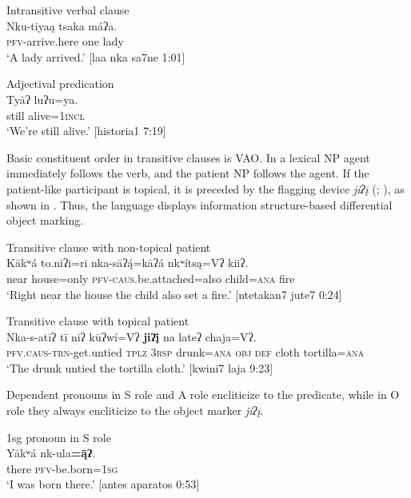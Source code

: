 \documentclass[output=paper]{../langscibook}
\begin{document}
\ea
\label{ex:campbell:2}
{Intransitive verbal clause}\\
\gll Nku-tiyaą  tsaka  máʔa.\\
     \textsc{pfv}{}-arrive.here  one  lady\\
\glt ‘A lady arrived.’ [laa nka sa7ne 1:01]
\z

\ea\label{ex:campbell:3}
{Adjectival predication}\\
\gll Tyāʔ  luʔu=ya.\\
     still  alive=\textsc{1incl}\\
\glt ‘We’re still alive.’ [historia1 7:19]
\z


Basic constituent order in transitive clauses is VAO. In  a lexical NP agent immediately follows the verb, and the patient NP follows the agent. If the patient-like participant is topical, it is preceded by the flagging device \textit{jiʔį} (\citealt{DalrympleNikolaeva2011}; \citealt{Campbell2015}), as shown in . Thus, the language displays information structure-based differential object marking.


\ea\label{ex:campbell:4}
{Transitive clause with non-topical patient}\\
\gll Kākʷá  to.niʔi=ri  nka-sāʔ\'{ą}=kāʔá  nkʷítsą=Vʔ  kiiʔ.\\
     near  house=only  \textsc{pfv-caus}.be.attached=also  child=\textsc{ana}  fire\\
\glt ‘Right near the house the child also set a fire.’ [ntetakan7 jute7 0:24]
\z

\ea\label{ex:campbell:5}
{Transitive clause with topical patient} \\
\gll Nka-s-atīʔ  tī  niʔ  kūʔwí=Vʔ  \textbf{jiʔį̄}  na  lateʔ  chaja=Vʔ.\\
     \textsc{pfv}.\textsc{caus}{}-\textsc{trn}{}-get.untied  \textsc{tplz}  \textsc{3rsp}  drunk=\textsc{ana}  \textsc{obj}  \textsc{def}  cloth  tortilla=\textsc{ana}\\
\glt ‘The drunk untied the tortilla cloth.’ [kwini7 laja 9:23]
\z


Dependent pronouns in S role  and A role  encliticize to the predicate, while in O role  they always encliticize to the object marker \textit{jiʔį}.


\ea\label{ex:campbell:6}
{1sg pronoun in S role}\\
\gll Yākʷá  nk-ula\textbf{=\={ą}ʔ}.\\
     there  \textsc{pfv}{}-be.born=\textsc{1sg}\\
\glt ‘I was born there.’ [antes aparatos 0:53]
\z
\end{document}
